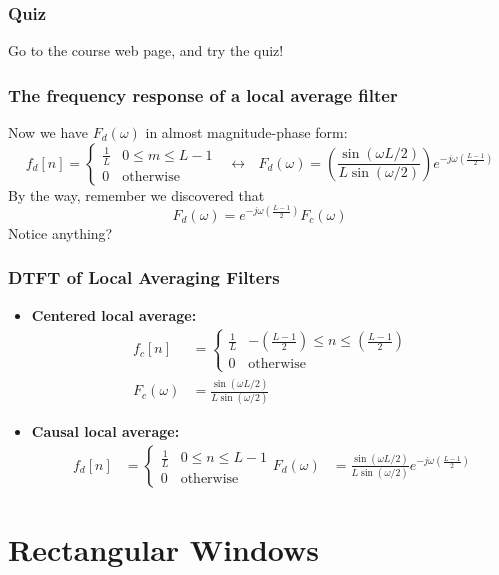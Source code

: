 \documentclass{beamer}
\begin{document}
\begin{frame}
  \frametitle{Quiz}

  Go to the course web page, and try the quiz!
\end{frame}

\begin{frame}
  \frametitle{The frequency response of a local average filter}

  Now we have $F_d(\omega)$ in almost magnitude-phase form:
  \[
  f_d[n] = \begin{cases} \frac{1}{L}& 0\le m\le L-1\\
    0&\mbox{otherwise}\end{cases}~~~\leftrightarrow~~~
  F_d(\omega)=\left(\frac{\sin(\omega L/2)}{L\sin(\omega/2)}\right)e^{-j\omega\left(\frac{L-1}{2}\right)}
  \]
  By the way, remember we discovered that
  \[
  F_d(\omega)=e^{-j\omega\left(\frac{L-1}{2}\right)}F_c(\omega)
  \]
  Notice anything?
\end{frame}

\begin{frame}
  \frametitle{DTFT of Local Averaging Filters}

  \begin{itemize}
  \item {\bf Centered local average:}
    \begin{align*}
      f_c[n] &= \begin{cases} \frac{1}{L}& -\left(\frac{L-1}{2}\right)\le n\le\left(\frac{L-1}{2}\right)\\
        0&\mbox{otherwise}\end{cases}\\
      F_c(\omega)&=\frac{\sin(\omega L/2)}{L\sin(\omega/2)}
    \end{align*}
  \item {\bf Causal local average:}
    \begin{align*}
      f_d[n] &= \begin{cases} \frac{1}{L}& 0\le n\le L-1\\
        0&\mbox{otherwise}\end{cases}
      F_d(\omega) &=\frac{\sin(\omega L/2)}{L\sin(\omega/2)}e^{-j\omega\left(\frac{L-1}{2}\right)}
    \end{align*}
  \end{itemize}
\end{frame}

\section[Rectangles]{Rectangular Windows}
\setcounter{subsection}{1}
\end{document}
